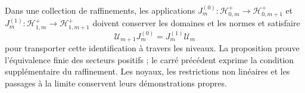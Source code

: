 Dans une collection de raffinements, les applications
\(J_m^{(0)}:\mathcal H_{0,m}^+\to\mathcal H_{0,m+1}^+\)
et
\(J_m^{(1)}:\mathcal H_{1,m}^+\to\mathcal H_{1,m+1}^+\)
doivent conserver les domaines et les normes et satisfaire
\[
 \mathcal U_{m+1}J_m^{(0)}
    =J_m^{(1)}\mathcal U_m
\]
pour transporter cette identification à travers les niveaux.
La proposition prouve l’équivalence finie des secteurs
positifs ; le carré précédent exprime la condition supplémentaire
du raffinement. Les noyaux, les restrictions non linéaires
et les passages à la limite conservent leurs démonstrations propres.

